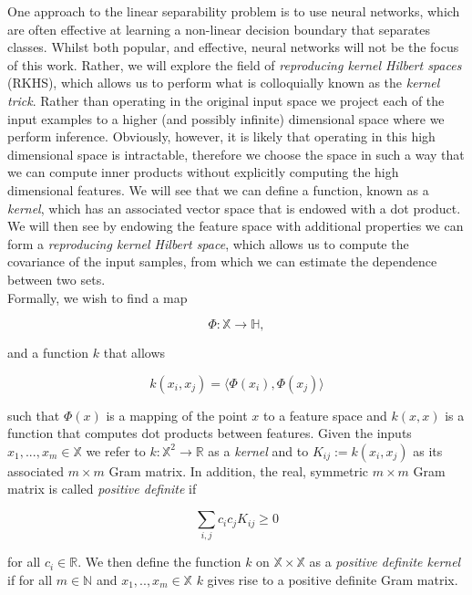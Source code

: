 One approach to the linear separability problem is to use neural networks, which are often effective at learning a non-linear decision boundary that separates classes. Whilst both popular, and effective, neural networks will not be the focus of this work. Rather, we will explore the field of \textit{reproducing kernel Hilbert spaces} (RKHS), which allows us to perform what is colloquially known as the \textit{kernel trick}. Rather than operating in the original input space we project each of the input examples to a higher (and possibly infinite) dimensional space where we perform inference. Obviously, however, it is likely that operating in this high dimensional space is intractable, therefore we choose the space in such a way that we can compute inner products without explicitly computing the high dimensional features. We will see that we can define a function, known as a \textit{kernel}, which has an associated vector space that is endowed with a dot product. We will then see by endowing the feature space with additional properties we can form a \textit{reproducing kernel Hilbert space}, which allows us to compute the covariance of the input samples, from which we can estimate the dependence between two sets. \\

Formally, we wish to find a map

\begin{equation}
\Phi \colon \mathbb{X} \rightarrow \mathbb{H},
\end{equation} 

\noindent and a function $k$ that allows

\begin{equation}
k(x_i, x_j) = \langle \Phi(x_i), \Phi(x_j) \rangle
\end{equation} 

\noindent such that $\Phi(x)$ is a mapping of the point $x$ to a feature space and $k(x, x)$ is a function that computes dot products between features. Given the inputs $x_1, ..., x_m \in \mathbb{X}$ we refer to $k 	\colon \mathbb{X}^2 \rightarrow \mathbb{R}$ as a \textit{kernel} and to $K_{ij} := k(x_i, x_j)$ as its associated $m \times m$ Gram matrix. In addition, the real, symmetric $m \times m$ Gram matrix is called \textit{positive definite} if 

\begin{equation}
\sum_{i,j}{c_i c_j K_{ij} \geq 0} 
\end{equation} 

\noindent for all $c_i \in \mathbb{R}$. We then define the function $k$ on $\mathbb{X} \times \mathbb{X}$ as a \textit{positive definite kernel} if for all $m \in \mathbb{N}$ and $x_1, .., x_m \in \mathbb{X}$ $k$ gives rise to a positive definite Gram matrix. \\

